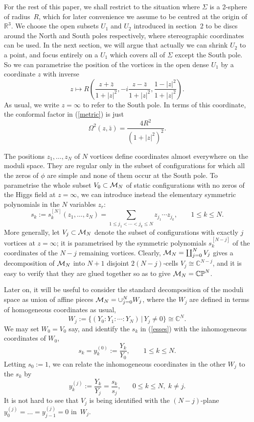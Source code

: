 \documentclass[a4paper,11pt]{article}
\begin{document}
For the rest of this paper, we shall restrict to the situation where
$\Sigma$ is a 2-sphere of radius~$R$, which for later convenience we
assume to be centred at the origin of $\mathbb{R}^{3}$. We choose
the open subsets $U_{1}$ and $U_{2}$ introduced in section~2 to be
discs around the North and South poles
respectively, where stereographic coordinates can be used.
In the next section, we will argue that actually we can shrink $U_{2}$
to a point, and focus entirely on a $U_{1}$ which covers all of $\Sigma$
except the South pole. So we can parametrise the position of the
vortices in the open dense $U_{1}$ by a coordinate $z$ with inverse 
\begin{equation} \label{cartes}
z\mapsto R\left(   
\frac{z+\bar{z}}{1+|z|^{2}},
-i\frac{z-\bar{z}}{1+|z|^{2}},
\frac{1-|z|^{2}}{1+|z|^{2}}
\right).
\end{equation}
As usual, we write $z=\infty$ to refer to the South pole.
In terms of this coordinate, the conformal factor in (\ref{metric}) is just
\begin{equation}\label{conffactor}
\Omega^{2}(z,\bar{z})=\frac{4R^{2}}{\left(1+|z|^{2}\right)^{2}}.
\end{equation}


The positions $z_{1},\ldots, z_{N}$ of $N$ vortices define coordinates
almost everywhere on the moduli space. They are regular only
in the subset of configurations for which all the zeros of $\phi$ 
are simple and none of them occur at the South pole. To 
parametrise the whole subset 
$V_{0}\subset{\cal M}_{N}$ of static configurations with no zeros of
the Higgs field at $z=\infty$, we can introduce instead the 
elementary symmetric polynomials in the $N$ variables $z_{r}$:
\begin{equation}\label{esses}
s_{k}:=s_{k}^{[N]}(z_{1},\ldots,z_{N})
=\sum_{1\le j_{1}<\cdots<j_{k}\le N}z_{j_{1}}\cdots z_{j_{k}}
,\;\;\;\;\;\;\;1\le k\le N.
\end{equation}
More generally, let $V_{j}\subset{\cal M}_{N}$ denote the subset of
configurations with exactly $j$ vortices at $z=\infty$; it is
parametrised by the symmetric polynomials $s_{k}^{[N-j]}$ of the 
coordinates of the $N-j$ remaining vortices. Clearly, 
${\cal M}_{N}=\coprod_{j=0}^{N}V_{j}$
gives a decomposition of ${\cal M}_{N}$ into $N+1$ disjoint $2(N-j)$-cells
$V_{j}\cong\mathbb{C}^{N-j}$, and it is easy to verify that they are
glued together so as to give ${\cal M}_{N}=\mathbb{CP}^{N}$.


Later on, it will be useful to consider the standard decomposition
of the moduli space as union of affine pieces 
${\cal M}_{N}=\cup_{j=0}^{N}W_{j}$, where the $W_{j}$ are defined
in terms of homogeneous coordinates as usual,
\[
W_{j}:=\{(Y_{0}:Y_{1}:\cdots:Y_{N})\,|\,Y_{j}\ne 0 \}\cong \mathbb{C}^{N}.
\]
We may set $W_{0}=V_{0}$ say, and identify the $s_{k}$ in
(\ref{esses}) with the inhomogeneous coordinates of $W_{0}$,
\[
s_{k}=y^{(0)}_{k}:=\frac{Y_{k}}{Y_{0}},\;\;\;\;\;\;\;1\le k\le N.
\]
Letting $s_{0}:=1$, we can relate the inhomogeneous coordinates in the
other $W_{j}$ to the $s_{k}$ by
\[
y_{k}^{(j)}:=\frac{Y_{k}}{Y_{j}}=\frac{s_{k}}{s_{j}},
\;\;\;\;\;\;0\le k \le N,\;k\ne j.
\]
It is not hard to see that $V_{j}$ is being identified with the $(N-j)$-plane
$y^{(j)}_{0}=\ldots=y^{(j)}_{j-1}=0$ in~$W_{j}$.
\end{document}
